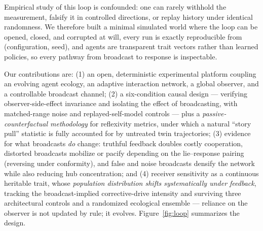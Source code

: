 \documentclass{svproc}
\begin{document}
Empirical study of this loop is confounded: one can rarely withhold the
measurement, falsify it in controlled directions, or replay
history under identical randomness. We therefore built a minimal simulated
world where the loop can be opened, closed, and corrupted at will, every
run is exactly reproducible from (configuration, seed), and agents are
transparent trait vectors rather than learned policies, so every pathway
from broadcast to response is inspectable.

Our contributions are: (1) an open, deterministic experimental platform
coupling an evolving agent ecology, an adaptive interaction network, a global
observer, and a controllable broadcast channel; (2) a six-condition causal
design --- verifying observer-side-effect invariance and isolating the effect
of broadcasting, with matched-range noise and replayed-self-model
controls --- plus a \emph{passive-counterfactual methodology} for reflexivity
metrics, under which a natural ``story pull'' statistic is fully accounted for
by untreated twin trajectories; (3) evidence for what broadcasts \emph{do}
change: truthful feedback doubles costly cooperation, distorted broadcasts
mobilize or pacify depending on the lie--response pairing (reversing under
conformity), and false and noise broadcasts densify the network while also
reducing hub concentration; and (4) receiver sensitivity as a continuous
heritable trait, whose \emph{population distribution shifts systematically
under feedback}, tracking the broadcast-implied corrective-drive intensity and
surviving three architectural controls and a randomized ecological ensemble ---
reliance on the observer is not updated by rule; it evolves. Figure~\ref{fig:loop} summarizes the design.
\end{document}
